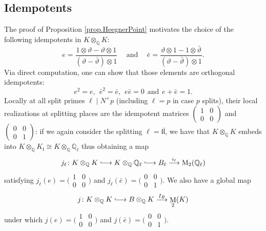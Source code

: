 \documentclass[a4paper]{amsart}
\numberwithin{equation}{section}
\theoremstyle{definition}
\newcommand{\Q}{\mathbb{Q}}
\DeclareMathOperator{\M}{M}
\newcommand{\longmono}{\mbox{\;$\lhook\joinrel\longrightarrow$\;}}
\begin{document}
\subsection{Idempotents}\label{subsec.Idempotents}
The proof of Proposition \ref{prop.HeegnerPoint} motivates the choice of the following idempotents in $K\otimes_\Q K$:
\[e=\frac{1\otimes\vartheta-\vartheta\otimes1}{(\vartheta-\bar{\vartheta})\otimes 1}\hspace{15pt}\text{and}\hspace{15pt}\bar{e}=\frac{\vartheta\otimes 1-1\otimes\bar{\vartheta}}{(\vartheta-\bar{\vartheta})\otimes1}.\]  Via direct computation, one can show that those elements are orthogonal idempotents: \[e^2=e,\hspace{5pt} \bar{e}^2=\bar{e},\hspace{5pt} e\bar{e}=0\hspace{5pt}\text{and}\hspace{5pt}e+\bar{e}=1.\]
Locally at all split primes $\ell\mid N^+p$ (including $\ell=p$ in case $p$ splits), their local realizations at splitting places are the idempotent matrices $\left(\begin{smallmatrix}1 & 0 \\ 0 & 0\end{smallmatrix}\right)$ and $\left(\begin{smallmatrix}0 & 0 \\ 0 & 1\end{smallmatrix}\right)$: if we again consider the splitting $\ell=\mathfrak{l}\bar{\mathfrak{l}}$, we have that $K\otimes_{\Q} K$ embeds into $K\otimes_{\Q}K_\mathfrak{l}\cong K\otimes_{\Q}\Q_\ell$ thus obtaining a map \[j_\ell\colon K\otimes_{\Q}K\longmono K\otimes_{\Q}\Q_\ell\longmono B_\ell\stackrel{i_\ell}{\longrightarrow}\mathrm{M}_2(\Q_\ell)\] satisfying $j_\ell(e)=\big(\begin{smallmatrix}1 & 0 \\ 0 & 0\end{smallmatrix}\big)$ and $j_\ell(\bar{e})=\big(\begin{smallmatrix}0 & 0 \\ 0 & 1\end{smallmatrix}\big)$. We also have a global map
\[j\colon K\otimes_\Q K \longmono B\otimes_\Q K\stackrel{I_B}{\longrightarrow} \M_2(K)\] under which  $j(e)=\big(\begin{smallmatrix}1 & 0 \\ 0 & 0\end{smallmatrix}\big)$ and $j(\bar{e})=\big(\begin{smallmatrix}0 & 0 \\ 0 & 1\end{smallmatrix}\big)$.
\end{document}
